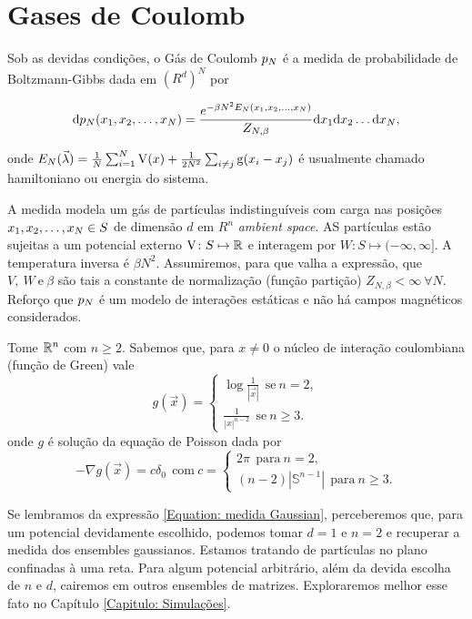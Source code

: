\section{Gases de Coulomb}

Sob as devidas condições, o Gás de Coulomb $p_N$ é \cite{CoulombGaschafai} a medida de probabilidade de Boltzmann-Gibbs dada em $(R^d)^N$ por 

\begin{equation}
	\dd p_N(x_1, x_2, \dots, x_N) = \frac{e^{-\beta N^2 E_N(x_1, x_2, \dots, x_N)}}{Z_{N,\beta}} \dd x_1  \dd x_2  \dots  \dd x_N,
	\label{Equação: Medida Gas de Coulomb}
\end{equation}

\noindent onde $E_N(\vec{\lambda}) = \frac{1}{N} \sum_{i = 1}^{N} \operatorname{V}(x) + \frac{1}{2N^2} \sum_{i \neq j} \operatorname{g}(x_i - x_j)$ é usualmente chamado hamiltoniano ou energia do sistema.

A medida modela um gás de partículas indistinguíveis com carga nas posições $x_1, x_2, \dots, x_N \in S$ de dimensão $d$ em $R^n$ \textit{ambient space}. AS partículas estão sujeitas a um potencial externo $\operatorname{V} \colon S \mapsto \mathbb{R}$ e interagem por $W \colon S \mapsto (-\infty, \infty]$. A temperatura inversa é $\beta N^2$. Assumiremos, para que valha a expressão, que $V, \ W \ \text{e} \ \beta$ são tais a constante de normalização (função partição) $Z_{N, \beta} < \infty \ \forall N$. Reforço que $p_N$ é um modelo de interações estáticas e não há campos magnéticos considerados.

Tome $\mathbb{R}^n$ com $n \geq 2$. Sabemos que, para $x \neq 0$ o núcleo de interação coulombiana (função de Green) vale $$
	g(\vec{x}) =
	\begin{cases}
			\log \frac{1}{|\vec{x}|} \ \ \text{se} \ n = 2,\\
			\frac{1}{|x|^{n-2}} \ \ \text{se} \ n \geq 3.
	\end{cases}
$$ onde $g$ é solução da equação de Poisson dada por $$
	- \nabla g(\vec{x}) = c\delta_0 \ \ \text{com} \ c = 
	\begin{cases}
		2\pi \ \ \text{para} \ n = 2,\\
		(n-2) |\mathbb{S}^{n-1}| \ \ \text{para} \ n \geq 3.
	\end{cases}
$$

Se lembramos da expressão \ref{Equation: medida Gaussian}, perceberemos que, para um potencial devidamente escolhido, podemos tomar $d=1$ e $n = 2$ e recuperar a medida dos ensembles gaussianos. Estamos tratando de partículas no plano confinadas à uma reta. Para algum potencial arbitrário, além da devida escolha de $n$ e $d$, cairemos em outros ensembles de matrizes. Exploraremos melhor esse fato no Capítulo \ref{Capitulo: Simulações}.